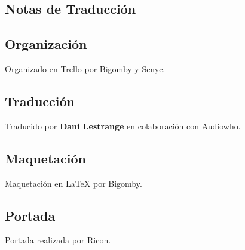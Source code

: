 \begin{center}
\section*{Notas de Traducción}
\end{center}

\mbox{}

\begingroup
\fontsize{9pt}{10pt}\selectfont
\parindent=0pt

\subsection*{Organización}\label{organizaciuxf3n}

Organizado en Trello por Bigomby y Scnyc.

\subsection*{Traducción}\label{traducciuxf3n}

Traducido por \textbf{Dani Lestrange} en colaboración con Audiowho.

\subsection*{Maquetación}\label{maquetaciuxf3n}

Maquetación en LaTeX por Bigomby.

\subsection*{Portada}\label{portada}

Portada realizada por Ricon.

\endgroup